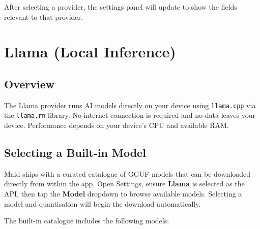 \documentclass[12pt,a4paper]{article}
\begin{document}
After selecting a provider, the settings panel will update to show the fields relevant to that provider.

\section{Llama (Local Inference)}

\subsection{Overview}

The Llama provider runs AI models directly on your device using \texttt{llama.cpp} via the \texttt{llama.rn} library. No internet connection is required and no data leaves your device. Performance depends on your device's CPU and available RAM.

\subsection{Selecting a Built-in Model}

Maid ships with a curated catalogue of GGUF models that can be downloaded directly from within the app. Open Settings, ensure \textbf{Llama} is selected as the API, then tap the \textbf{Model} dropdown to browse available models. Selecting a model and quantisation will begin the download automatically.

The built-in catalogue includes the following models:
\end{document}
